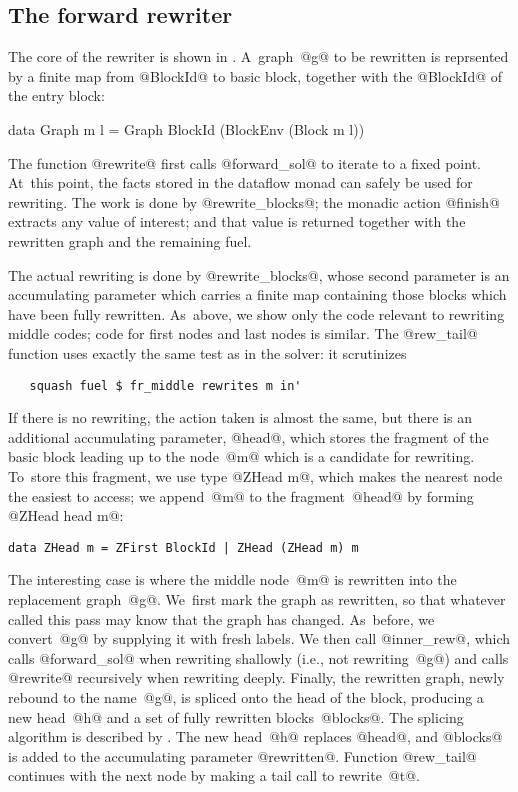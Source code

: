 \subsection{The forward rewriter}

The core of the rewriter is shown in .
A~graph~@g@ to be rewritten is reprsented by a finite map from  @BlockId@
  to basic block, together with the @BlockId@ of the entry block:
\begin{code}
data Graph m l = Graph BlockId (BlockEnv (Block m l))
\end{code}
The function @rewrite@ first calls @forward_sol@ to iterate to a fixed
point.
At~this point, the facts stored in the dataflow monad can safely be
used for rewriting.
The work is done by @rewrite_blocks@; the monadic action @finish@
extracts any value of interest; and that value is returned together
with the rewritten graph and the remaining fuel.

The actual rewriting is done by @rewrite_blocks@, whose second parameter is
an accumulating parameter which carries a finite map containing those
blocks which have been fully rewritten.
As~above, we show only the code relevant to rewriting middle codes;
code for first nodes and last nodes is similar.
The @rew_tail@ function uses exactly the same test as in the solver:
it scrutinizes
\begin{verbatim}
   squash fuel $ fr_middle rewrites m in'
\end{verbatim}
If there is no rewriting, the action taken is almost the same, but
there is an additional accumulating parameter, @head@, which stores
the fragment of the basic block leading up to the node~@m@ which is
a candidate for rewriting.
To~store this fragment, we use type @ZHead m@, which makes the
nearest node the easiest to access; we append~@m@ to the
fragment~@head@ by forming @ZHead head m@:
\begin{verbatim} 
data ZHead m = ZFirst BlockId | ZHead (ZHead m) m
\end{verbatim}

The interesting case is where the middle node~@m@ is rewritten into
the replacement graph~@g@. 
We~first mark the graph as rewritten, so that whatever called this
pass may know that the graph has changed.
As~before, we convert~@g@ by supplying it with fresh labels.
We then call @inner_rew@, which calls @forward_sol@ when rewriting
shallowly (i.e., not rewriting~@g@) and calls @rewrite@ recursively
when rewriting deeply.
Finally, the rewritten graph, newly rebound to the name~@g@, is
spliced onto the head of the block, producing a new head~@h@ and a set
of fully rewritten blocks~@blocks@.
The splicing algorithm is described by
\citet{ramsey-dias:applicative-control-flow}. 
The new head~@h@ replaces @head@, and @blocks@ is added to the
accumulating parameter @rewritten@.
Function @rew_tail@ continues with the next node by making a tail call
to rewrite~@t@.






